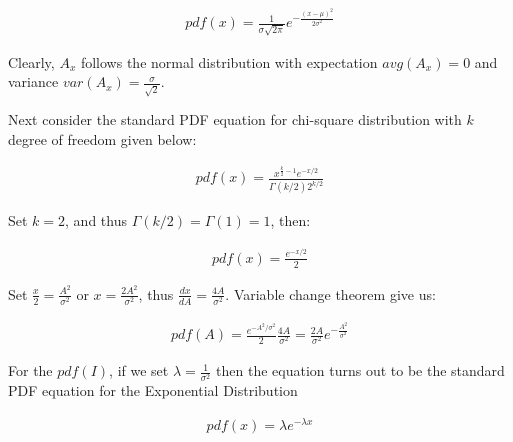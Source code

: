 \begin{align}
pdf(x) = \frac{1}{\sigma \sqrt{2\pi}} e^{- \frac{(x-\mu)^2}{2 \sigma^2}}
\end{align}

Clearly, $A_x$ follows the normal distribution with expectation $avg(A_x)=0$ and variance $var(A_x)=\frac{\sigma}{\sqrt{2}}$.

Next consider the standard PDF equation for chi-square distribution with $k$ degree of freedom given below:

\begin{align}
pdf(x) = \frac{x^{\frac{k}{2}-1}e^{-x/2}}{\Gamma(k/2)2^{k/2}}
\end{align}

Set $k=2$, and thus $\Gamma(k/2)=\Gamma(1)=1$, then:

\begin{align}
pdf(x) = \frac{e^{-x/2}}{2} 
\end{align}

Set $\frac{x}{2} = \frac{A^2}{\sigma^2}$ or $x = \frac{2A^2}{\sigma^2}$, thus $\frac{dx}{dA} = \frac{4A}{\sigma^2}$.
Variable change theorem give us:

\begin{align}
pdf(A) = \frac{e^{-A^2/\sigma^2}}{2} \frac{4A}{\sigma^2} = \frac{2A}{\sigma^2} e^{-\frac{A^2}{\sigma^2}}
\end{align}


For the $pdf(I)$, if we set $\lambda = \frac{1}{\sigma^2}$ then the equation turns out to be the standard PDF equation for the Exponential Distribution 

\begin{align}
pdf(x) = \lambda e^{- \lambda x}
\end{align}
